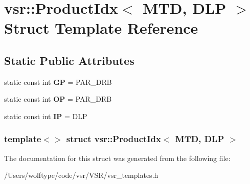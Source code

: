 \hypertarget{structvsr_1_1_product_idx_3_01_m_t_d_00_01_d_l_p_01_4}{\section{vsr\-:\-:Product\-Idx$<$ M\-T\-D, D\-L\-P $>$ Struct Template Reference}
\label{structvsr_1_1_product_idx_3_01_m_t_d_00_01_d_l_p_01_4}
}
\subsection*{Static Public Attributes}
\begin{DoxyCompactItemize}
\item 
\hypertarget{structvsr_1_1_product_idx_3_01_m_t_d_00_01_d_l_p_01_4_a73f07fef5c0d91749d621e98026f4a15}{static const int {\bfseries G\-P} = P\-A\-R\-\_\-\-D\-R\-B}\label{structvsr_1_1_product_idx_3_01_m_t_d_00_01_d_l_p_01_4_a73f07fef5c0d91749d621e98026f4a15}

\item 
\hypertarget{structvsr_1_1_product_idx_3_01_m_t_d_00_01_d_l_p_01_4_a2febedb0e6c29ef76a07fe8c0a1a5578}{static const int {\bfseries O\-P} = P\-A\-R\-\_\-\-D\-R\-B}\label{structvsr_1_1_product_idx_3_01_m_t_d_00_01_d_l_p_01_4_a2febedb0e6c29ef76a07fe8c0a1a5578}

\item 
\hypertarget{structvsr_1_1_product_idx_3_01_m_t_d_00_01_d_l_p_01_4_acf4d2182a2e72ade4701b2d1b7b7e873}{static const int {\bfseries I\-P} = D\-L\-P}\label{structvsr_1_1_product_idx_3_01_m_t_d_00_01_d_l_p_01_4_acf4d2182a2e72ade4701b2d1b7b7e873}

\end{DoxyCompactItemize}
\subsubsection*{template$<$$>$ struct vsr\-::\-Product\-Idx$<$ M\-T\-D, D\-L\-P $>$}



The documentation for this struct was generated from the following file\-:\begin{DoxyCompactItemize}
\item 
/\-Users/wolftype/code/vsr/\-V\-S\-R/vsr\-\_\-templates.\-h\end{DoxyCompactItemize}
